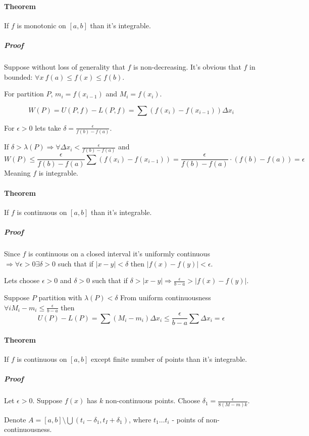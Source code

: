 \paragraph{Theorem} If $f$ is monotonic on $[a,b]$ than it's integrable.
\subparagraph{Proof} Suppose without loss of generality that $f$ is non-decreasing.
It's obvious that $f$ in bounded: $\forall x \: f(a)\leq f(x) \leq f(b)$.

For partition $P$, $m_i = f(x_{i-1})$ and $M_i = f(x_i)$.

$$W(P) = U(P,f) - L(P,f) = \sum \left( f(x_i) - f(x_{i-1}) \right) \Delta x_i $$

For $\epsilon > 0$ lets take $\delta = \frac{\epsilon}{f(b)-f(a)}$.

If $\delta > \lambda(P) \Rightarrow \forall \Delta x_i <  \frac{\epsilon}{f(b)-f(a)}$ and 
$$W(P) \leq \frac{\epsilon}{f(b)-f(a)} \sum \left( f(x_i) - f(x_{i-1}) \right) = \frac{\epsilon}{f(b)-f(a)}  \cdot \left(f(b)-f(a)\right) = \epsilon$$
Meaning $f$ is integrable.
\paragraph{Theorem} If $f$ is continuous on $[a,b]$ than it's integrable.
\subparagraph{Proof} Since $f$ is continuous on a closed interval it's uniformly continuous $\Rightarrow \forall \epsilon > 0 \exists \delta > 0 $ such that if $|x-y| < \delta$ then $|f(x)-f(y)| < \epsilon$.

Lets choose $\epsilon > 0 $ and $\delta > 0 $ such that if $\delta > |x-y| \Rightarrow \frac{\epsilon}{b-a} > |f(x)-f(y)|$.

Suppose $P$ partition with $\lambda(P) < \delta$
From uniform continuousness $\forall i M_i-m_i \leq \frac{\epsilon}{b-a}$ then $$U(P)-L(P) = \sum (M_i-m_i) \Delta x_i \leq \frac{\epsilon}{b-a} \sum \Delta x_i = \epsilon$$

\paragraph{Theorem} If $f$ is continuous on $[a,b]$  except finite number of points  than it's integrable.
\subparagraph{Proof} 
Let $\epsilon > 0$. Suppose $f(x)$ has $k$ non-continuous points. Choose $\delta_1 = \frac{\epsilon}{8(M-m)k}$.

Denote $A = [a,b] \setminus \bigcup (t_i-\delta_1, t_I+\delta_1)$, where $t_1 \dots t_i$ - points of non-continuousness.

